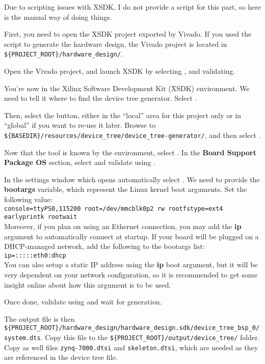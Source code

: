 \documentclass[openany,a4paper]{book}
\begin{document}
Due to scripting issues with XSDK, I do not provide a script for this part, so here is the manual way of doing things.

First, you need to open the XSDK project exported by Vivado.
If you used the script to generate the hardware design, the Vivado project is located in \nolinkurl{${PROJECT_ROOT}/hardware_design/}.

Open the Vivado project, and launch XSDK by selecting , and validating.

You're now in the Xilinx Software Development Kit (XSDK) environment.
We need to tell it where to find the device tree generator.
Select .

Then, select the  button, either in the ``local'' area for this project only or in ``global'' if you want to re-use it later.
Browse to \nolinkurl{${BASEDIR}/resources/device_tree/device_tree-generator/}, and then select .

Now that the tool is known by the environment, select .
In the \textbf{Board Support Package OS} section, select  and validate using .

In the settings window which opens automatically select .
We need to provide the \textbf{bootargs} variable, which represent the Linux kernel boot arguments.
Set the following value: \\ \texttt{console=ttyPS0,115200 root=/dev/mmcblk0p2 rw rootfstype=ext4 earlyprintk rootwait} \\
Moreover, if you plan on using an Ethernet connection, you may add the \textbf{ip} argument to automatically connect at startup.
If your board will be plugged on a DHCP-managed network, add the following to the bootargs list: \\ \texttt{ip=:::::eth0:dhcp} \\
You can also setup a static IP address using the \textbf{ip} boot argument, but it will be very dependent on your network configuration, so it is recommended to get some insight online about how this argument is to be used.

Once done, validate using  and wait for generation.

The output file is then \nolinkurl{${PROJECT_ROOT}/hardware_design/hardware_design.sdk/device_tree_bsp_0/system.dts}.
Copy this file to the \nolinkurl{${PROJECT_ROOT}/output/device_tree/} folder.
Copy as well files \nolinkurl{zynq-7000.dtsi} and \nolinkurl{skeleton.dtsi}, which are needed as they are referenced in the device tree file.
\end{document}
